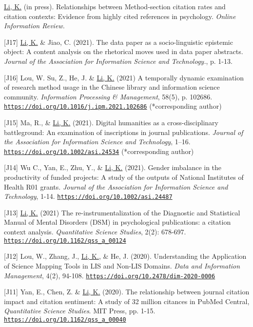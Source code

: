 \documentclass[margin, 10pt]{res} %
\begin{document}
\begin{resume}
[J18] \underline{Li, K.} (in press). Relationships between Method-section citation rates and citation contexts: Evidence from highly cited references in psychology. \textit{Online Information Review.}

[J17] \underline{Li, K.} \& Jiao, C. (2021). The data paper as a socio-linguistic epistemic object: A content analysis on the rhetorical moves used in data paper abstracts. \textit{Journal of the Association for Information Science and Technology.}, p. 1-13.

[J16] Lou, W. Su, Z., He, J. \& \underline{Li, K.} (2021) A temporally dynamic examination of research method usage in the Chinese library and information science community. \textit{Information Processing \& Management}, 58(5), p. 102686. \href{https://doi.org/10.1016/j.ipm.2021.102686}{\nolinkurl{https://doi.org/10.1016/j.ipm.2021.102686}} (*corresponding author)

[J15] Ma, R., \& \underline{Li, K.} (2021). Digital humanities as a cross-disciplinary battleground: An examination of inscriptions in journal publications. \textit{Journal of the Association for Information Science and Technology}, 1–16. \href{https://doi.org/10.1002/asi.24534}{\nolinkurl{https://doi.org/10.1002/asi.24534}} (*corresponding author)

[J14] Wu C., Yan, E., Zhu, Y., \& \underline{Li, K.} (2021). Gender imbalance in the productivity of funded projects: A study of the outputs of National Institutes of Health R01 grants. \textit{Journal of the Association for Information Science and Technology}, 1-14. \href{https://doi.org/10.1002/asi.24487}{\nolinkurl{https://doi.org/10.1002/asi.24487}}

[J13] \underline{Li, K.} (2021) The re-instrumentalization of the Diagnostic and Statistical Manual of Mental Disorders (DSM) in psychological publications: a citation context analysis. \textit{Quantitative Science Studies}, 2(2): 678-697. \href{https://doi.org/10.1162/qss_a_00124}{\nolinkurl{https://doi.org/10.1162/qss_a_00124}}

[J12] Lou, W., Zhang, J., \underline{Li, K.}, \& He, J. (2020). Understanding the Application of Science Mapping Tools in LIS and Non-LIS Domains. \textit{Data and Information Management}, 4(2), 94-108. \href{https://doi.org/10.2478/dim-2020-0006}{\nolinkurl{https://doi.org/10.2478/dim-2020-0006}}

[J11] Yan, E., Chen, Z. \& \underline{Li, K.} (2020). The relationship between journal citation impact and citation sentiment: A study of 32 million citances in PubMed Central, \textit{Quantitative Science Studies}. MIT Press, pp. 1-15. \href{https://doi.org/10.1162/qss\_a\_00040}{\nolinkurl{https://doi.org/10.1162/qss_a_00040}}


\end{resume}
\end{document}
